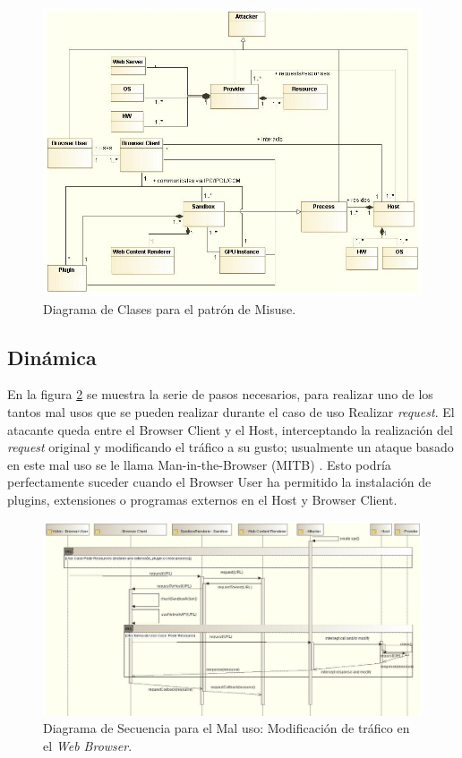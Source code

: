 \documentclass{sig-alternate-05-2015}
\begin{document}
\begin{figure}[h!t]
  \centering
  \includegraphics[scale=0.55]{figures/patronMisuse_v2.jpg}
  \caption{Diagrama de Clases para el patrón de Misuse.}
  \label{fig:BIMisuse}
\end{figure}

\subsection{Dinámica}
En la figura \ref{fig:SeqMisuse} se muestra la serie de pasos necesarios, para realizar uno de los tantos mal usos que se pueden realizar durante el caso de uso Realizar \textit{request}. El atacante queda entre el Browser Client y el Host, interceptando la realización del \textit{request} original y modificando el tráfico a su gusto; usualmente un ataque basado en este mal uso se le llama Man-in-the-Browser (MITB) \cite{Liu2012, Barth2010, Utakrit2009, Dougan2012}. Esto podría perfectamente suceder cuando el Browser User ha permitido la instalación de plugins, extensiones o programas externos en el Host y Browser Client.

\begin{figure}[h!t]
  \centering
  \includegraphics[scale=0.52]{figures/patronMisuseSeq_v2.jpg}
  \caption{Diagrama de Secuencia para el Mal uso: Modificación de tráfico en el \textit{Web Browser}.}
  \label{fig:SeqMisuse}
\end{figure}
\end{document}
